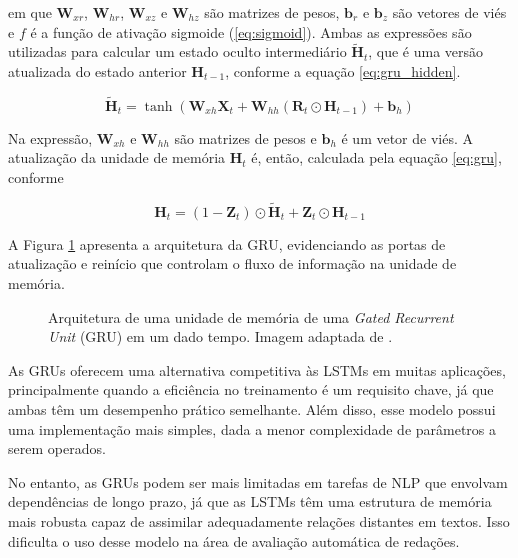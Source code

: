 em que $\boldsymbol{W}_{xr}$, $\boldsymbol{W}_{hr}$, $\boldsymbol{W}_{xz}$ e $\boldsymbol{W}_{hz}$ são matrizes de pesos, $\boldsymbol{b}_{r}$ e $\boldsymbol{b}_{z}$ são vetores de viés e $f$ é a função de ativação sigmoide (\ref{eq:sigmoid}). Ambas as expressões são utilizadas para calcular um estado oculto intermediário $\tilde{\boldsymbol{H}}_{t}$, que é uma versão atualizada do estado anterior $\boldsymbol{H}_{t-1}$, conforme a equação \ref{eq:gru_hidden}.

\begin{equation}
    \label{eq:gru_hidden}
    \tilde{\boldsymbol{H}}_{t} = \tanh \left( \boldsymbol{W}_{xh} \boldsymbol{X}_{t} + \boldsymbol{W}_{hh} (\boldsymbol{R}_{t} \odot \boldsymbol{H}_{t-1}) + \boldsymbol{b}_{h} \right)
\end{equation}

Na expressão, $\boldsymbol{W}_{xh}$ e $\boldsymbol{W}_{hh}$ são matrizes de pesos e $\boldsymbol{b}_{h}$ é um vetor de viés. A atualização da unidade de memória $\boldsymbol{H}_{t}$ é, então, calculada pela equação \ref{eq:gru}, conforme \citet{zhang2023dive}

\begin{equation}
    \label{eq:gru}
    \boldsymbol{H}_{t} = (1 - \boldsymbol{Z}_{t}) \odot \tilde{\boldsymbol{H}}_{t} + \boldsymbol{Z}_{t} \odot \boldsymbol{H}_{t-1}
\end{equation}

A Figura \ref{fig:gru_architecture} apresenta a arquitetura da GRU, evidenciando as portas de atualização e reinício que controlam o fluxo de informação na unidade de memória.

\begin{figure}[H]
    \centering
    \caption{Arquitetura de uma unidade de memória de uma \textit{Gated Recurrent Unit} (GRU) em um dado tempo. Imagem adaptada de \cite{zhang2023dive}.}
    \label{fig:gru_architecture}
    
\end{figure}

As GRUs oferecem uma alternativa competitiva às LSTMs em muitas aplicações, principalmente quando a eficiência no treinamento é um requisito chave, já que ambas têm um desempenho prático semelhante. Além disso, esse modelo possui uma implementação mais simples, dada a menor complexidade de parâmetros a serem operados.

No entanto, as GRUs podem ser mais limitadas em tarefas de NLP que envolvam dependências de longo prazo, já que as LSTMs têm uma estrutura de memória mais robusta capaz de assimilar adequadamente relações distantes em textos. Isso dificulta o uso desse modelo na área de avaliação automática de redações.


